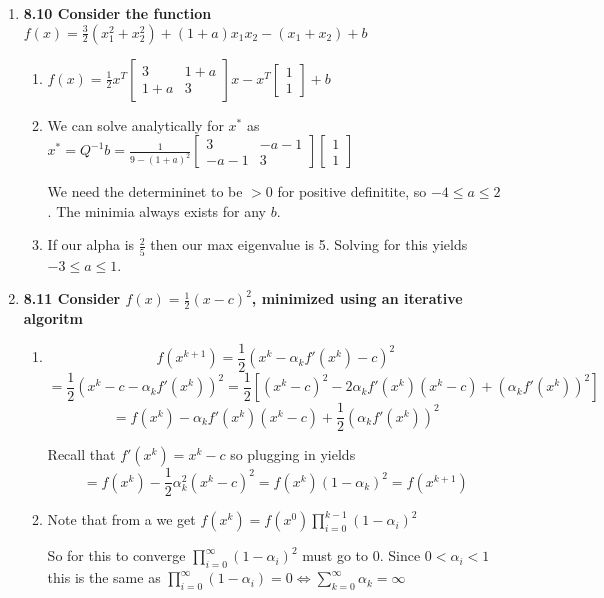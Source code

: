 \documentclass[10pt,a4paper]{article}
\begin{document}
\begin{enumerate}
    \item \textbf{8.10 Consider the function $f(x) = \frac{3}{2}(x_1^2 +x_2^2) + (1+a)x_1x_2 - (x_1 + x_2) + b$}
    \begin{enumerate}
    \item $f(x) = \frac{1}{2}x^T \begin{bmatrix} 3 & 1+a \\ 1+a & 3 \end{bmatrix}x - x^T \begin{bmatrix} 1 \\ 1 \end{bmatrix} + b$
    \item We can solve analytically for $x^*$ as $x^* = Q^{-1}b = \frac{1}{9 - (1+a)^2} \begin{bmatrix} 3 & -a-1 \\ -a-1 & 3 \end{bmatrix} \begin{bmatrix} 1 \\ 1\end{bmatrix}$
    
    We need the determininet to be $>0$ for positive definitite, so $-4 \leq a \leq 2$. The minimia always exists for any $b$.
    \item If our alpha is $\frac{2}{5}$ then our max eigenvalue is 5. Solving for this yields $-3 \leq a \leq 1 $.
    \end{enumerate}

    \item \textbf{8.11 Consider $f(x) = \frac{1}{2} (x-c)^2$, minimized using an iterative algoritm}
    \begin{enumerate}
        \item $$f(x^{k+1}) = \frac{1}{2}(x^k - \alpha_k f'(x^k) - c)^2$$
        $$= \frac{1}{2}(x^k -c - \alpha_k f'(x^k))^2 = \frac{1}{2}[(x^k -c)^2 -2\alpha_k f'(x^k)(x^k -c) + (\alpha_k f'(x^k))^2 ]$$
        $$= f(x^k) - \alpha_k f'(x^k)(x^k -c) + \frac{1}{2}(\alpha_k f'(x^k))^2$$

        Recall that $f'(x^k) = x^k - c$ so plugging in yields
        $$= f(x^k)  - \frac{1}{2}\alpha_k^2 (x^k - c)^2 = f(x^k)(1 -\alpha_k)^2 = f(x^{k+1})$$

        \item Note that from a we get $f(x^k) = f(x^0) \prod_{i=0}^{k-1} (1 - \alpha_i)^2$
        
        So for this to converge $\prod_{i=0}^{\infty} (1 - \alpha_i)^2$ must go to 0.
        Since $ 0 < \alpha_i < 1$ this is the same as $\prod_{i=0}^{\infty} (1 - \alpha_i) = 0 \iff \sum_{k=0}^\infty \alpha_k = \infty$


\end{enumerate}
\end{enumerate}
\end{document}
